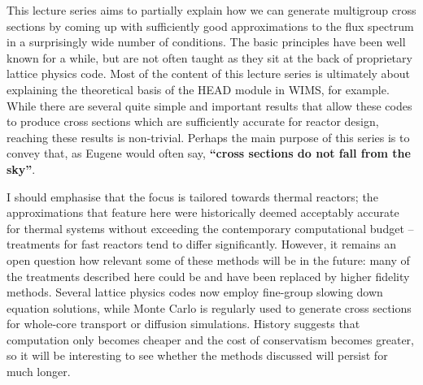 This lecture series aims to partially explain how we can generate multigroup cross sections by coming up with sufficiently good approximations to the flux spectrum in a surprisingly wide number of conditions. The basic principles have been well known for a while, but are not often taught as they sit at the back of proprietary lattice physics code. Most of the content of this lecture series is ultimately about explaining the theoretical basis of the HEAD module in WIMS, for example. While there are several quite simple and important results that allow these codes to produce cross sections which are sufficiently accurate for reactor design, reaching these results is non-trivial. Perhaps the main purpose of this series is to convey that, as Eugene would often say, \textbf{``cross sections do not fall from the sky''}.

I should emphasise that the focus is tailored towards thermal reactors; the approximations that feature here were historically deemed acceptably accurate for thermal systems without exceeding the contemporary computational budget -- treatments for fast reactors tend to differ significantly. However, it remains an open question how relevant some of these methods will be in the future: many of the treatments described here could be and have been replaced by higher fidelity methods. Several lattice physics codes now employ fine-group slowing down equation solutions, while Monte Carlo is regularly used to generate cross sections for whole-core transport or diffusion simulations. History suggests that computation only becomes cheaper and the cost of conservatism becomes greater, so it will be interesting to see whether the methods discussed will persist for much longer.
